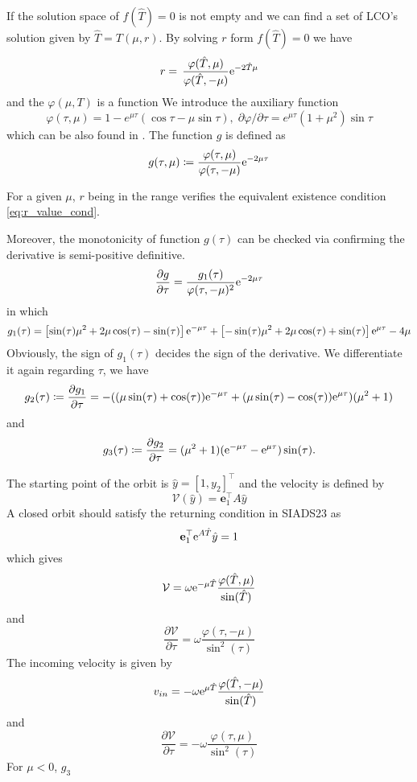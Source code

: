 \documentclass{article}
\begin{document}
If the solution space of $f(\hat{T}) =0 $ is not empty and we can find a set of LCO's solution given by 
$\hat{T} = T(\mu, r)$.
By solving $r$ form $f(\hat{T}) =0$  we have 
\begin{equation}
	r =\, \frac{\varphi(\hat{T}, \mu)}{\varphi(\hat{T}, -\mu)}  {\rm e}^{-2 \hat{T} \mu} 
	\label{eq:r_value_cond}
\end{equation}
and the $\varphi(\mu,T)$ is a function 
We introduce the auxiliary function
\begin{equation}
	\varphi(\tau,\mu)=1- e^{\mu \tau}(\cos{\tau}-\mu\sin{\tau}), 
	\; \partial \varphi/\partial{\tau}=e^{\mu\tau}(1+\mu^2)\sin{\tau}
\end{equation}
which can be also found in \cite{ANDRONOV1966443}.
%
The function $g$ is defined as 
\[
g(\tau,\mu) \coloneq \frac{\varphi(\tau, \mu)}{\varphi(\tau, -\mu)}  {\rm e}^{-2 \mu \tau}
\]

For a given $\mu$,  $r$ being in the range verifies the equivalent  existence condition 
\cref{eq:r_value_cond}. 

Moreover, the monotonicity of function $g(\tau)$ can be checked via confirming the derivative is semi-positive definitive.
% 
\begin{equation}
	\frac{\partial  g}{\partial  \tau} = \frac{g_1(\tau)}{\varphi(\tau,-\mu)^2} {\rm e}^{-2\mu \tau}
\end{equation}
in which 
\[
g_1(\tau) = \left[
\sin(\tau) \mu^2 + 2\mu \cos(\tau) - \sin(\tau)\right]
{\rm e}^{ - \mu \tau} 
+ 
\left[
-\sin(\tau) \mu^2 + 2\mu\cos(\tau) + \sin(\tau)
\right] {\rm e}^{\mu \tau} - 4\mu
\]
Obviously, the sign of $g_1(\tau)$ decides the sign of the derivative. We differentiate it again regarding $\tau$, we have
\[
g_2(\tau) \coloneq
\frac{\partial g_1}{\partial \tau} = -((\mu \sin(\tau) + \cos(\tau)) {\rm e}^{- \mu \tau} + (\mu \sin(\tau) - \cos(\tau)) {\rm e}^{ \mu \tau}) (\mu^2 + 1)
\]
and 
\[
g_3(\tau) \coloneq
\frac{\partial g_2}{\partial \tau} =(\mu^2 + 1)({\rm e}^{- \mu \tau} - {\rm e}^{ \mu \tau}) \sin(\tau).
\]

The starting point of the orbit is 
$
\hat{y} = [1,y_2]^{\top}
$
and the velocity is defined by
\begin{equation}
\mathcal{V}(\hat{y}) = \mathbf{e}_1^{\top} A \hat{y}
\end{equation}
A closed orbit should satisfy the returning condition in SIADS23 as 
\[
\mathbf{e}_1^{\top} {\rm e}^{A \hat{T}} \hat{y} = 1
\]
which gives 
\[
 \mathcal{V} = \omega {\rm e}^{-\mu \hat{T}} \frac{\varphi(\hat{T},\mu) }{\sin(\hat{T})}
\]
and 
\begin{equation}
	\frac{\partial \mathcal{V}}{\partial \tau} = \omega \frac{\varphi(\tau,-\mu)}{\sin^2(\tau)}
\end{equation}
The incoming velocity is given by
\[
v_{in} = -\omega {\rm e}^{\mu \hat{T}} \frac{\varphi(\hat{T},-\mu)}{\sin(\hat{T})}
\]
and 
\begin{equation}
	\frac{\partial \mathcal{V}}{\partial \tau} = -\omega \frac{\varphi(\tau,\mu)}{\sin^2(\tau)}
\end{equation}
 For $\mu < 0$, $g_3$
 
\end{document}
